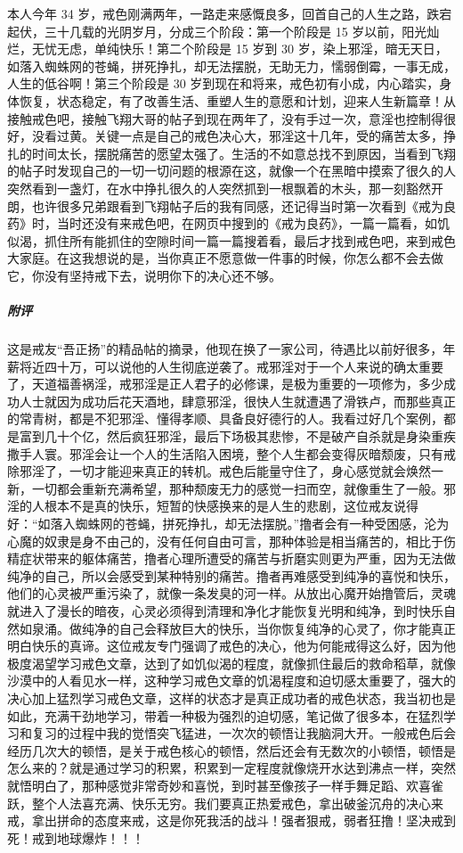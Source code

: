 \begin{case}
    本人今年 34 岁，戒色刚满两年，一路走来感慨良多，回首自己的人生之路，跌宕起伏，三十几载的光阴岁月，分成三个阶段：第一个阶段是 15 岁以前，阳光灿烂，无忧无虑，单纯快乐！第二个阶段是 15 岁到 30 岁，染上邪淫，暗无天日，如落入蜘蛛网的苍蝇，拼死挣扎，却无法摆脱，无助无力，懦弱倒霉，一事无成，人生的低谷啊！第三个阶段是 30 岁到现在和将来，戒色初有小成，内心踏实，身体恢复，状态稳定，有了改善生活、重塑人生的意愿和计划，迎来人生新篇章！从接触戒色吧，接触飞翔大哥的帖子到现在两年了，没有手过一次，意淫也控制得很好，没看过黄。关键一点是自己的戒色决心大，邪淫这十几年，受的痛苦太多，挣扎的时间太长，摆脱痛苦的愿望太强了。生活的不如意总找不到原因，当看到飞翔的帖子时发现自己的一切一切问题的根源在这，就像一个在黑暗中摸索了很久的人突然看到一盏灯，在水中挣扎很久的人突然抓到一根飘着的木头，那一刻豁然开朗，也许很多兄弟跟看到飞翔帖子后的我有同感，还记得当时第一次看到《戒为良药》时，当时还没有来戒色吧，在网页中搜到的《戒为良药》，一篇一篇看，如饥似渴，抓住所有能抓住的空隙时间一篇一篇搜着看，最后才找到戒色吧，来到戒色大家庭。在这我想说的是，当你真正不愿意做一件事的时候，你怎么都不会去做它，你没有坚持戒下去，说明你下的决心还不够。
    \subparagraph{附评} 这是戒友“吾正扬”的精品帖的摘录，他现在换了一家公司，待遇比以前好很多，年薪将近四十万，可以说他的人生彻底逆袭了。戒邪淫对于一个人来说的确太重要了，天道福善祸淫，戒邪淫是正人君子的必修课，是极为重要的一项修为，多少成功人士就因为成功后花天酒地，肆意邪淫，很快人生就遭遇了滑铁卢，而那些真正的常青树，都是不犯邪淫、懂得孝顺、具备良好德行的人。我看过好几个案例，都是富到几十个亿，然后疯狂邪淫，最后下场极其悲惨，不是破产自杀就是身染重疾撒手人寰。邪淫会让一个人的生活陷入困境，整个人生都会变得灰暗颓废，只有戒除邪淫了，一切才能迎来真正的转机。戒色后能量守住了，身心感觉就会焕然一新，一切都会重新充满希望，那种颓废无力的感觉一扫而空，就像重生了一般。邪淫的人根本不是真的快乐，短暂的快感换来的是人生的悲剧，这位戒友说得好：“如落入蜘蛛网的苍蝇，拼死挣扎，却无法摆脱。”撸者会有一种受困感，沦为心魔的奴隶是身不由己的，没有任何自由可言，那种体验是相当痛苦的，相比于伤精症状带来的躯体痛苦，撸者心理所遭受的痛苦与折磨实则更为严重，因为无法做纯净的自己，所以会感受到某种特别的痛苦。撸者再难感受到纯净的喜悦和快乐，他们的心灵被严重污染了，就像一条发臭的河一样。从放出心魔开始撸管后，灵魂就进入了漫长的暗夜，心灵必须得到清理和净化才能恢复光明和纯净，到时快乐自然如泉涌。做纯净的自己会释放巨大的快乐，当你恢复纯净的心灵了，你才能真正明白快乐的真谛。这位戒友专门强调了戒色的决心，他为何能戒得这么好，因为他极度渴望学习戒色文章，达到了如饥似渴的程度，就像抓住最后的救命稻草，就像沙漠中的人看见水一样，这种学习戒色文章的饥渴程度和迫切感太重要了，强大的决心加上猛烈学习戒色文章，这样的状态才是真正成功者的戒色状态，我当初也是如此，充满干劲地学习，带着一种极为强烈的迫切感，笔记做了很多本，在猛烈学习和复习的过程中我的觉悟突飞猛进，一次次的顿悟让我脑洞大开。一般戒色后会经历几次大的顿悟，是关于戒色核心的顿悟，然后还会有无数次的小顿悟，顿悟是怎么来的？就是通过学习的积累，积累到一定程度就像烧开水达到沸点一样，突然就悟明白了，那种感觉非常奇妙和喜悦，到时甚至像孩子一样手舞足蹈、欢喜雀跃，整个人法喜充满、快乐无穷。我们要真正热爱戒色，拿出破釜沉舟的决心来戒，拿出拼命的态度来戒，这是你死我活的战斗！强者狠戒，弱者狂撸！坚决戒到死！戒到地球爆炸！！！
\end{case}

